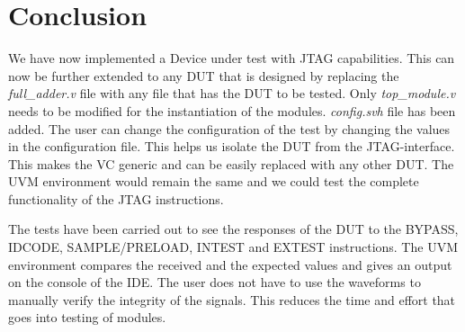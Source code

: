 \documentclass[a4paper,11pt]{article}
\begin{document}
\section{Conclusion}

We have now implemented a Device under test with JTAG capabilities. This can now be further extended to any DUT that is designed by replacing the \textit{full\_adder.v} file with any file that has the DUT to be tested. Only \textit{top\_module.v} needs to be modified for the instantiation of the modules. \textit{config.svh} file has been added. The user can change the configuration of the test by changing the values in the configuration file. This helps us isolate the DUT from the JTAG-interface. This makes the VC generic and can be easily replaced with any other DUT. The UVM environment would remain the same and we could test the complete functionality of the JTAG instructions.

The tests have been carried out to see the responses of the DUT to the BYPASS, IDCODE, SAMPLE/PRELOAD, INTEST and EXTEST instructions. The UVM environment compares the received and the expected values and gives an output on the console of the IDE. The user does not have to use the waveforms to manually verify the integrity of the signals. This reduces the time and effort that goes into testing of modules.
\end{document}
